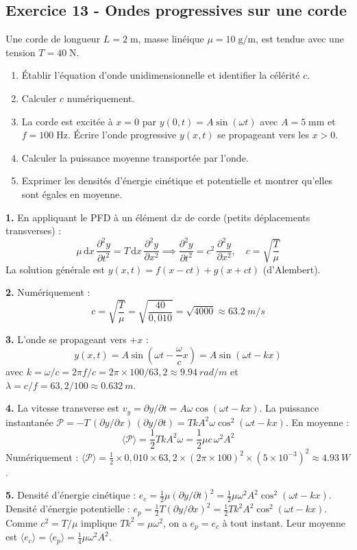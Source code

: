 \documentclass[12pt,a4paper]{article}
\begin{document}
\subsection*{Exercice 13 - Ondes progressives sur une corde \niveau{\moyen}}

\begin{boiteexercice}
Une corde de longueur $L=2\;\text{m}$, masse linéique $\mu=10\;\text{g/m}$, est tendue avec une tension $T=40\;\text{N}$.
\begin{enumerate}
  \item Établir l'équation d'onde unidimensionnelle et identifier la célérité $c$.
  \item Calculer $c$ numériquement.
  \item La corde est excitée à $x=0$ par $y(0,t)=A\sin(\omega t)$ avec $A=5\;\text{mm}$ et $f=100\;\text{Hz}$. Écrire l'onde progressive $y(x,t)$ se propageant vers les $x>0$.
  \item Calculer la puissance moyenne transportée par l'onde.
  \item Exprimer les densités d'énergie cinétique et potentielle et montrer qu'elles sont égales en moyenne.
\end{enumerate}
\end{boiteexercice}

\begin{boitecorrige}
\textbf{1.} En appliquant le PFD à un élément $\text{d}x$ de corde (petits déplacements transverses) :
\[
\mu\,\text{d}x\,\frac{\partial^2 y}{\partial t^2} = T\,\text{d}x\,\frac{\partial^2 y}{\partial x^2} \implies \boxed{\frac{\partial^2 y}{\partial t^2} = c^2\,\frac{\partial^2 y}{\partial x^2}}, \quad c = \sqrt{\frac{T}{\mu}}
\]
La solution générale est $y(x,t)=f(x-ct)+g(x+ct)$ (d'Alembert).

\textbf{2.} Numériquement :
\[
c = \sqrt{\frac{T}{\mu}} = \sqrt{\frac{40}{0{,}010}} = \sqrt{4000} \approx \qty{63.2}{m/s}
\]

\textbf{3.} L'onde se propageant vers $+x$ :
\[
y(x,t) = A\sin\!\left(\omega t - \frac{\omega}{c}x\right) = A\sin(\omega t - kx)
\]
avec $k = \omega/c = 2\pi f/c = 2\pi\times100/63{,}2 \approx \qty{9.94}{rad/m}$ et $\lambda = c/f = 63{,}2/100 \approx \qty{0.632}{m}$.

\textbf{4.} La vitesse transverse est $v_y=\partial y/\partial t = A\omega\cos(\omega t-kx)$. La puissance instantanée $\mathcal{P} = -T\,(\partial y/\partial x)\,(\partial y/\partial t) = T k A^2\omega\cos^2(\omega t-kx)$. En moyenne :
\[
\langle\mathcal{P}\rangle = \frac{1}{2}TkA^2\omega = \frac{1}{2}\mu c\,\omega^2 A^2
\]
Numériquement : $\langle\mathcal{P}\rangle = \frac{1}{2}\times0{,}010\times63{,}2\times(2\pi\times100)^2\times(5\times10^{-3})^2 \approx \qty{4.93}{W}$.

\textbf{5.} Densité d'énergie cinétique : $e_c = \frac{1}{2}\mu(\partial y/\partial t)^2 = \frac{1}{2}\mu\omega^2 A^2\cos^2(\omega t-kx)$.
Densité d'énergie potentielle : $e_p = \frac{1}{2}T(\partial y/\partial x)^2 = \frac{1}{2}Tk^2 A^2\cos^2(\omega t-kx)$.
Comme $c^2=T/\mu$ implique $Tk^2=\mu\omega^2$, on a $e_p = e_c$ à tout instant. Leur moyenne est $\langle e_c\rangle=\langle e_p\rangle=\frac{1}{4}\mu\omega^2 A^2$.
\end{boitecorrige}
\end{document}
